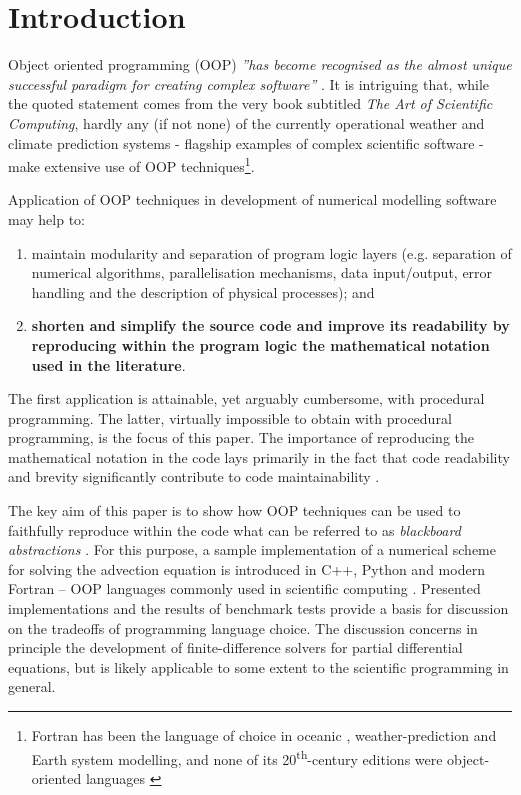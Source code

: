 \documentclass[twocolumn]{article}
\begin{document}
  \twocolumn
 
  \tableofcontents

  \section{Introduction}

  Object oriented programming (OOP) {\em ''has become recognised as the almost unique successful 
    paradigm for creating complex software''} \citep[][Sec.~1.3]{Press_et_al_2007}.
  It is intriguing that, while the quoted statement comes from the very book subtitled 
   {\em The Art of Scientific Computing}, hardly any (if not none) of the currently operational 
    weather and climate prediction systems - flagship examples of complex scientific software - 
    make extensive use of OOP techniques\footnote{
  Fortran has been the language of choice in oceanic \citep{Griffies_et_al_2000}, 
    weather-prediction \citep{Sundberg_2009} and Earth system \citep{Legutke_2012} modelling, 
    and none of its 20\textsuperscript{th}-century editions were object-oriented languages \citep[see e.g.][for discussion]{Norton_et_al_2007}}.

  Application of OOP techniques in development of numerical modelling software may help to:
  \begin{enumerate}[label=(\roman*), leftmargin=*, widest=ii]
    \item{maintain modularity and separation of program logic layers (e.g. separation of
      numerical algorithms, parallelisation mechanisms, data input/output, error handling and
      the description of physical processes); and}
    \item{{\bf shorten and simplify the source code and improve its readability by reproducing within 
      the program logic the mathematical notation used in the literature}.}
  \end{enumerate}
  The first application is attainable, yet arguably cumbersome, with procedural programming.
  The latter, virtually impossible to obtain with procedural programming, is the focus of this paper.
  The importance of reproducing the mathematical notation in the code lays primarily
    in the fact that code readability and brevity 
    significantly contribute to code maintainability \citep{Wilson_et_al_2012}.

  The key aim of this paper is to show how OOP techniques can be used to faithfully
    reproduce within the code what can be referred to as {\em blackboard abstractions} \citep{Rouson_et_al_2012}.
  For this purpose, a sample implementation of a numerical scheme for solving
    the advection equation is introduced in C++, Python and modern Fortran --
    OOP languages commonly used in scientific computing \citep[see e.g.][chapt.~8]{Einarsson_2005}. 
  Presented implementations and the results of benchmark tests
    provide a basis for discussion on the tradeoffs of programming language choice.
  The discussion concerns in principle the development of finite-difference solvers for 
    partial differential equations, but is likely applicable to some extent to the scientific programming in general.
\end{document}
